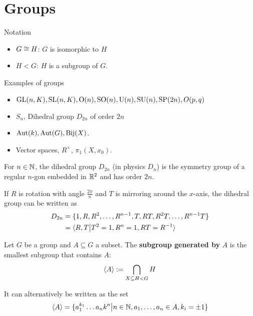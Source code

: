 \section{Groups}

Notation
\begin{itemize}
  \item $G \cong H$: $G$ is isomorphic to $H$
  \item $H < G$: $H$ is a subgroup of $G$.
\end{itemize}

Examples of groups
\begin{itemize}
  \item $\operatorname{GL}(n,K), \operatorname{SL}(n,K), \text{O}(n),\operatorname{SO}(n),\text{U}(n),\text{SU}(n), \text{SP}(2n), O(p,q)$
  \item $S_n$, Dihedral group $D_{2n}$ of order $2n$
  \item $\operatorname{Aut}(k), \operatorname{Aut}(G), \text{Bij}(X)$.
  \item Vector spaces, $R^{\times}$, $\pi_1(X,x_0)$.
\end{itemize}

\begin{ex}
  For $n \in \mathbb{N}$, the dihedral group $D_{2n}$ (in physics $D_n$) is the symmetry group of a regular $n$-gon embedded in $\mathbb{R}^{2}$ and has order $2n$.

  If $R$ is rotation with angle $\frac{2\pi}{n}$ and $T$ is mirroring around the $x$-axis,
  the dihedral group can be written as
  \begin{align*}
    D_{2n} 
    &= \{1,R,R^{2},\ldots,R^{n-1},T,RT,R^{2}T,\ldots,R^{n-1}T\}\\
    &= \langle R,T\big\vert T^{2} = 1, R^{n} = 1,RT = R^{-1}\rangle
  \end{align*}

\end{ex}

\begin{dfn}
Let $G$ be a group and $A \subseteq G$ a subset. 
The \textbf{subgroup generated by} $A$ is the smallest subgroup that contains $A$:
\begin{align*}
  \langle A\rangle := \bigcap_{X \subseteq H < G} H
\end{align*}
\end{dfn}
It can alternatively be written as the set
\begin{align*}
  \langle A\rangle = \{a_1^{k_1} \dots a_nk^{n} \big\vert n \in \mathbb{N}, a_{1}, \ldots, a_{n} \in A, k_i = \pm 1\}
\end{align*}


